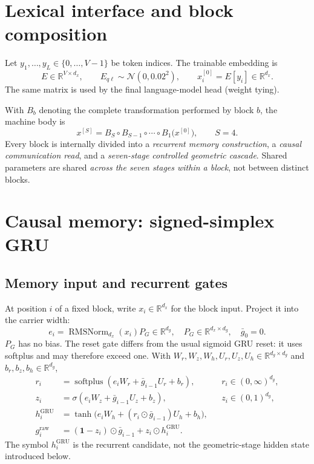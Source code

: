 \documentclass[11pt,a4paper]{article}
\newcommand{\R}{\mathbb{R}}
\newcommand{\rmsn}{\operatorname{RMSNorm}}
\newcommand{\softplus}{\operatorname{softplus}}
\newcommand{\gbar}{\bar g}
\newcommand{\one}{\mathbf{1}}
\begin{document}
\section{Lexical interface and block composition}

Let $y_1,\dots,y_L\in\{0,\dots,V-1\}$ be token indices. The trainable embedding is
\begin{equation}
E\in\R^{V\times d_x},\qquad E_{q\ell}\sim\mathcal N(0,0.02^2),\qquad x_i^{[0]}=E[y_i]\in\R^{d_x}.
\end{equation}
The same matrix is used by the final language-model head (weight tying).

With $B_b$ denoting the complete transformation performed by block $b$, the machine body is
\begin{equation}
x^{[S]}=B_S\circ B_{S-1}\circ\cdots\circ B_1\bigl(x^{[0]}\bigr),\qquad S=4.
\end{equation}
Every block is internally divided into a \emph{recurrent memory construction}, a \emph{causal
communication read}, and a \emph{seven-stage controlled geometric cascade}. Shared parameters are
shared \emph{across the seven stages within a block}, not between distinct blocks.

\section{Causal memory: signed-simplex GRU}

\subsection{Memory input and recurrent gates}

At position $i$ of a fixed block, write $x_i\in\R^{d_x}$ for the block input. Project it into the
carrier width:
\begin{equation}
e_i=\rmsn_{d_x}(x_i)P_G\in\R^{d_g},\quad P_G\in\R^{d_x\times d_g},\quad \gbar_0=0.
\end{equation}
$P_G$ has no bias. The reset gate differs from the usual sigmoid GRU reset: it uses softplus and may
therefore exceed one. With $W_r,W_z,W_h,U_r,U_z,U_h\in\R^{d_g\times d_g}$ and $b_r,b_z,b_h\in\R^{d_g}$,
\begin{align}
r_i&=\softplus(e_iW_r+\gbar_{i-1}U_r+b_r), && r_i\in(0,\infty)^{d_g},\\
z_i&=\sigma(e_iW_z+\gbar_{i-1}U_z+b_z), && z_i\in(0,1)^{d_g},\\
h_i^{\mathrm{GRU}}&=\tanh\bigl(e_iW_h+(r_i\odot\gbar_{i-1})U_h+b_h\bigr),\\
g_i^{\mathrm{raw}}&=(\one-z_i)\odot\gbar_{i-1}+z_i\odot h_i^{\mathrm{GRU}}.
\end{align}
The symbol $h_i^{\mathrm{GRU}}$ is the recurrent candidate, not the geometric-stage hidden state
introduced below.
\end{document}
